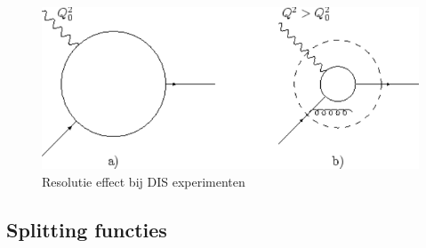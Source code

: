 \documentclass[../main.tex]{subfiles}
\begin{document}
\begin{figure}[h]
    \centering
    \includegraphics[width=0.8\linewidth]{QCD/resolutie.png}
    \caption{Resolutie effect bij DIS experimenten}%
    \label{fig:dis_resolutie}
\end{figure}

\subsection{Splitting functies}%
\label{sub:splitting_functies}
\end{document}

